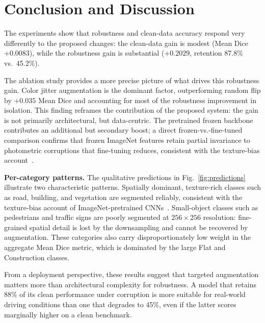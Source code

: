 \documentclass[conference]{IEEEtran}
\begin{document}
\section{Conclusion and Discussion}

The experiments show that robustness and clean-data accuracy respond very differently to the proposed changes: the clean-data gain is modest (Mean Dice $+0.0083$), while the robustness gain is substantial ($+0.2029$, retention 87.8\% vs.\ 45.2\%).

The ablation study provides a more precise picture of what drives this robustness gain. Color jitter augmentation is the dominant factor, outperforming random flip by $+0.035$ Mean Dice and accounting for most of the robustness improvement in isolation. This finding reframes the contribution of the proposed system: the gain is not primarily architectural, but data-centric. The pretrained frozen backbone contributes an additional but secondary boost; a direct frozen-vs.-fine-tuned comparison confirms that frozen ImageNet features retain partial invariance to photometric corruptions that fine-tuning reduces, consistent with the texture-bias account~\cite{geirhos2019}.

\textbf{Per-category patterns.}
The qualitative predictions in Fig.~\ref{fig:predictions} illustrate two characteristic patterns. Spatially dominant, texture-rich classes such as road, building, and vegetation are segmented reliably, consistent with the texture-bias account of ImageNet-pretrained CNNs~\cite{geirhos2019}. Small-object classes such as pedestrians and traffic signs are poorly segmented at $256\times256$ resolution: fine-grained spatial detail is lost by the downsampling and cannot be recovered by augmentation. These categories also carry disproportionately low weight in the aggregate Mean Dice metric, which is dominated by the large Flat and Construction classes.

From a deployment perspective, these results suggest that targeted augmentation matters more than architectural complexity for robustness. A model that retains 88\% of its clean performance under corruption is more suitable for real-world driving conditions than one that degrades to 45\%, even if the latter scores marginally higher on a clean benchmark.
\end{document}
